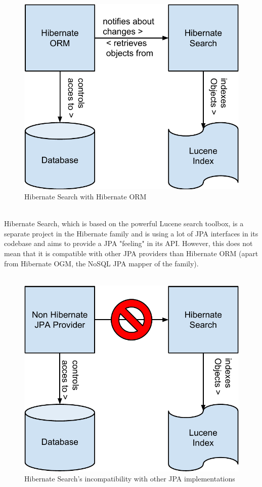 \begin{figure}[ht]
	\centering
	\includegraphics[scale=0.5]{images/hibernate_search_hibernate_schema.pdf}
		\caption{Hibernate Search with Hibernate ORM}
		\label{fig1}
\end{figure}
\\
Hibernate Search, which is based on the powerful Lucene search toolbox, is a separate project in the Hibernate family and is using a lot of JPA interfaces in its codebase and aims to provide a JPA "feeling" in its API. However, this does not mean that it is compatible with other JPA providers than Hibernate ORM (apart from Hibernate OGM, the NoSQL JPA mapper of the family).
\\\\
\begin{figure}[ht]
	\centering
	\includegraphics[scale=0.5]{images/hibernate_search_any_jpa_problem_schema.pdf}
	\caption{Hibernate Search's incompatibility with other JPA implementations}
	\label{fig2}
\end{figure}
